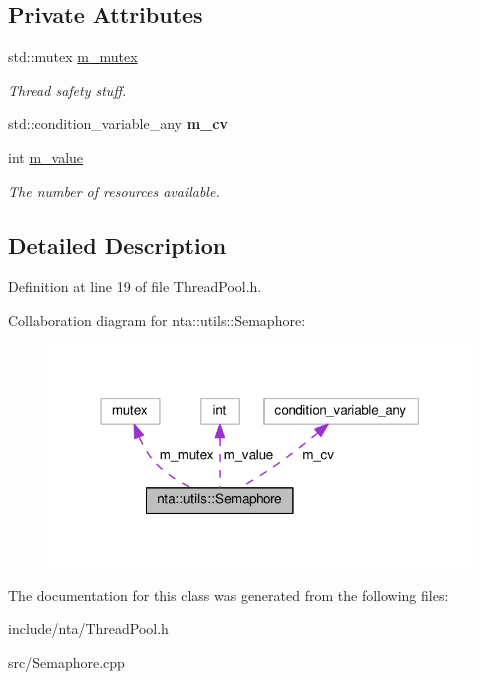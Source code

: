 \subsection*{Private Attributes}
\begin{DoxyCompactItemize}
\item 
\mbox{\label{classnta_1_1utils_1_1Semaphore_a5d349e7ced70eb07eea6b9cfa50a6637}} 
std\+::mutex \hyperlink{classnta_1_1utils_1_1Semaphore_a5d349e7ced70eb07eea6b9cfa50a6637}{m\+\_\+mutex}
\begin{DoxyCompactList}\small\item\em Thread safety stuff. \end{DoxyCompactList}\item 
\mbox{\label{classnta_1_1utils_1_1Semaphore_a30bfcf40c58c71847933806aeab36b30}} 
std\+::condition\+\_\+variable\+\_\+any {\bfseries m\+\_\+cv}
\item 
\mbox{\label{classnta_1_1utils_1_1Semaphore_a7b21b47d4cfecfeeb97758916e23c9bc}} 
int \hyperlink{classnta_1_1utils_1_1Semaphore_a7b21b47d4cfecfeeb97758916e23c9bc}{m\+\_\+value}
\begin{DoxyCompactList}\small\item\em The number of resources available. \end{DoxyCompactList}\end{DoxyCompactItemize}


\subsection{Detailed Description}


Definition at line 19 of file Thread\+Pool.\+h.



Collaboration diagram for nta\+:\+:utils\+:\+:Semaphore\+:\nopagebreak
\begin{figure}[H]
\begin{center}
\leavevmode
\includegraphics[width=318pt]{da/d79/classnta_1_1utils_1_1Semaphore__coll__graph}
\end{center}
\end{figure}


The documentation for this class was generated from the following files\+:\begin{DoxyCompactItemize}
\item 
include/nta/Thread\+Pool.\+h\item 
src/Semaphore.\+cpp\end{DoxyCompactItemize}
